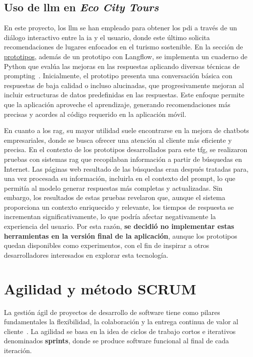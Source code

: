 	
	\subsection{Uso de \acrlong{llm} en \textit{Eco City Tours}}
	En este proyecto, los \acrlong{llm} se han empleado para obtener los \acrfull{pdi} a través de un diálogo interactivo entre la \acrlong{ia} y el usuario, donde este último solicita recomendaciones de lugares enfocados en el turismo sostenible. En la sección de \href{https://github.com/fps1001/TFGII_FPisot/tree/main/project-prototypes/README.md}{prototipos}, además de un prototipo con Langflow, se implementa un cuaderno de Python que evalúa las mejoras en las respuestas aplicando diversas técnicas de prompting~\cite{promptingguide}. Inicialmente, el prototipo presenta una conversación básica con respuestas de baja calidad o incluso alucinadas, que progresivamente mejoran al incluir estructuras de datos predefinidas en las respuestas. Este enfoque permite que la aplicación aproveche el aprendizaje, generando recomendaciones más precisas y acordes al código requerido en la aplicación móvil.
	
	En cuanto a los \acrfull{rag}, su mayor utilidad suele encontrarse en la mejora de chatbots empresariales, donde se busca ofrecer una atención al cliente más eficiente y precisa. En el contexto de los prototipos desarrollados para este \acrshort{tfg}, se realizaron pruebas con sistemas \acrshort{rag} que recopilaban información a partir de búsquedas en Internet. Las páginas web resultado de las búsquedas eran después tratadas para, una vez procesada su información,  incluirla en el contexto del prompt, lo que permitía al modelo generar respuestas más completas y actualizadas. Sin embargo, los resultados de estas pruebas revelaron que, aunque el sistema proporciona un contexto enriquecido y relevante, los tiempos de respuesta se incrementan significativamente, lo que podría afectar negativamente la experiencia del usuario. Por esta razón,\textbf{ se decidió no implementar estas herramientas en la versión final de la aplicación}, aunque los prototipos quedan disponibles como experimentos, con el fin de inspirar a otros desarrolladores interesados en explorar esta tecnología.

\section{Agilidad y método SCRUM}
La gestión ágil de proyectos de desarrollo de software tiene como pilares fundamentales la flexibilidad, la colaboración y la entrega continua de valor al cliente~\cite{agile_alliance}. La agilidad se basa en la idea de ciclos de trabajo cortos e iterativos denominados \textbf{sprints}, donde se produce software funcional al final de cada iteración.


